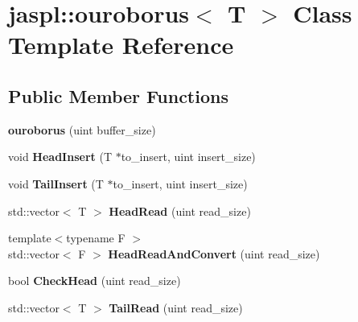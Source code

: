 \hypertarget{classjaspl_1_1ouroborus}{}\section{jaspl\+:\+:ouroborus$<$ T $>$ Class Template Reference}
\label{classjaspl_1_1ouroborus}
\subsection*{Public Member Functions}
\begin{DoxyCompactItemize}
\item 
{\bfseries ouroborus} (uint buffer\+\_\+size)\hypertarget{classjaspl_1_1ouroborus_afc5380d2850dd026af3c3d70d150bf60}{}\label{classjaspl_1_1ouroborus_afc5380d2850dd026af3c3d70d150bf60}

\item 
void {\bfseries Head\+Insert} (T $\ast$to\+\_\+insert, uint insert\+\_\+size)\hypertarget{classjaspl_1_1ouroborus_a6d16f36785bb75315e520fcb17f46b8c}{}\label{classjaspl_1_1ouroborus_a6d16f36785bb75315e520fcb17f46b8c}

\item 
void {\bfseries Tail\+Insert} (T $\ast$to\+\_\+insert, uint insert\+\_\+size)\hypertarget{classjaspl_1_1ouroborus_a7592cd37c22235d01d306d36ca8da370}{}\label{classjaspl_1_1ouroborus_a7592cd37c22235d01d306d36ca8da370}

\item 
std\+::vector$<$ T $>$ {\bfseries Head\+Read} (uint read\+\_\+size)\hypertarget{classjaspl_1_1ouroborus_a4bc7a38915ec1bebfcc185b0d626ba19}{}\label{classjaspl_1_1ouroborus_a4bc7a38915ec1bebfcc185b0d626ba19}

\item 
{\footnotesize template$<$typename F $>$ }\\std\+::vector$<$ F $>$ {\bfseries Head\+Read\+And\+Convert} (uint read\+\_\+size)\hypertarget{classjaspl_1_1ouroborus_a3927bb1e83d608b0c0ef8a2f50a17b9d}{}\label{classjaspl_1_1ouroborus_a3927bb1e83d608b0c0ef8a2f50a17b9d}

\item 
bool {\bfseries Check\+Head} (uint read\+\_\+size)\hypertarget{classjaspl_1_1ouroborus_ac595602b6e133b4c6cef5ffed2ff1fbd}{}\label{classjaspl_1_1ouroborus_ac595602b6e133b4c6cef5ffed2ff1fbd}

\item 
std\+::vector$<$ T $>$ {\bfseries Tail\+Read} (uint read\+\_\+size)\hypertarget{classjaspl_1_1ouroborus_a81fe174d4952d7e0eb5e2008d0971bae}{}\label{classjaspl_1_1ouroborus_a81fe174d4952d7e0eb5e2008d0971bae}


\end{DoxyCompactItemize}
